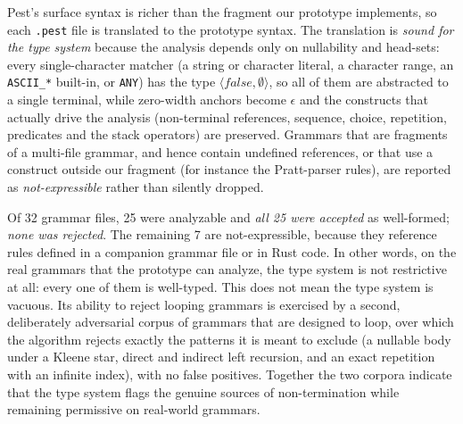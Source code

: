 \documentclass[preprint,12pt]{elsarticle}
\theoremstyle{definition}
\begin{document}
Pest's surface syntax is richer than the fragment our prototype implements, so
each \texttt{.pest} file is translated to the prototype syntax.
The translation is \emph{sound for the type system} because the
analysis depends only on nullability and head-sets: every single-character
matcher (a string or character literal, a character range, an \texttt{ASCII\_*}
built-in, or \texttt{ANY}) has the type $\langle false, \emptyset\rangle$, so all
of them are abstracted to a single terminal, while zero-width anchors become
$\epsilon$ and the constructs that actually drive the analysis (non-terminal
references, sequence, choice, repetition, predicates and the stack operators) are
preserved. Grammars that are fragments of a multi-file grammar, and hence contain
undefined references, or that use a construct outside our fragment (for instance
the Pratt-parser rules), are reported as \emph{not-expressible} rather than
silently dropped.

Of 32 grammar files, 25 were analyzable and \emph{all 25 were accepted} as
well-formed; \emph{none was rejected}. The remaining 7 are not-expressible,
because they reference rules defined in a companion grammar file or in Rust code.
In other words, on the real grammars that the prototype can analyze, the type
system is not restrictive at all: every one of them is well-typed. This does not
mean the type system is vacuous. Its ability to reject looping grammars is
exercised by a second, deliberately adversarial corpus of grammars that are
designed to loop, over which the algorithm rejects exactly the patterns it is
meant to exclude (a nullable body under a Kleene star, direct and indirect left
recursion, and an exact repetition with an infinite index), with no false
positives. Together the two corpora indicate that the type system flags the
genuine sources of non-termination while remaining permissive on real-world
grammars.

\end{document}

